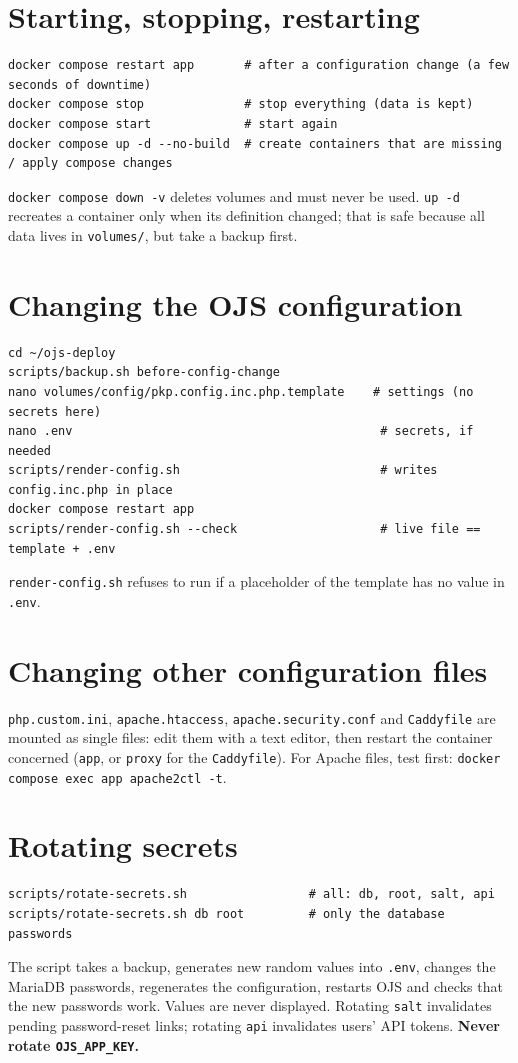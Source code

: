 \documentclass[11pt,a4paper]{report}
\newcommand{\code}[1]{\texttt{\small #1}}
\newcommand{\file}[1]{\texttt{\small #1}}
\begin{document}
\section{Starting, stopping, restarting}
\begin{lstlisting}
docker compose restart app       # after a configuration change (a few seconds of downtime)
docker compose stop              # stop everything (data is kept)
docker compose start             # start again
docker compose up -d --no-build  # create containers that are missing / apply compose changes
\end{lstlisting}
\begin{warning}
\code{docker compose down -v} deletes volumes and must never be used. \code{up -d} recreates a
container only when its definition changed; that is safe because all data lives in
\file{volumes/}, but take a backup first.
\end{warning}

\section{Changing the OJS configuration}\label{sec:configchange}
\begin{lstlisting}
cd ~/ojs-deploy
scripts/backup.sh before-config-change
nano volumes/config/pkp.config.inc.php.template    # settings (no secrets here)
nano .env                                           # secrets, if needed
scripts/render-config.sh                            # writes config.inc.php in place
docker compose restart app
scripts/render-config.sh --check                    # live file == template + .env
\end{lstlisting}
\file{render-config.sh} refuses to run if a placeholder of the template has no value in \file{.env}.

\section{Changing other configuration files}
\file{php.custom.ini}, \file{apache.htaccess}, \file{apache.security.conf} and \file{Caddyfile}
are mounted as single files: edit them with a text editor, then restart the container concerned
(\code{app}, or \code{proxy} for the \file{Caddyfile}). For Apache files, test first:
\code{docker compose exec app apache2ctl -t}.

\section{Rotating secrets}
\begin{lstlisting}
scripts/rotate-secrets.sh                 # all: db, root, salt, api
scripts/rotate-secrets.sh db root         # only the database passwords
\end{lstlisting}
The script takes a backup, generates new random values into \file{.env}, changes the MariaDB
passwords, regenerates the configuration, restarts OJS and checks that the new passwords work.
Values are never displayed. Rotating \code{salt} invalidates pending password-reset links;
rotating \code{api} invalidates users' API tokens. \textbf{Never rotate \code{OJS\_APP\_KEY}.}
\end{document}
